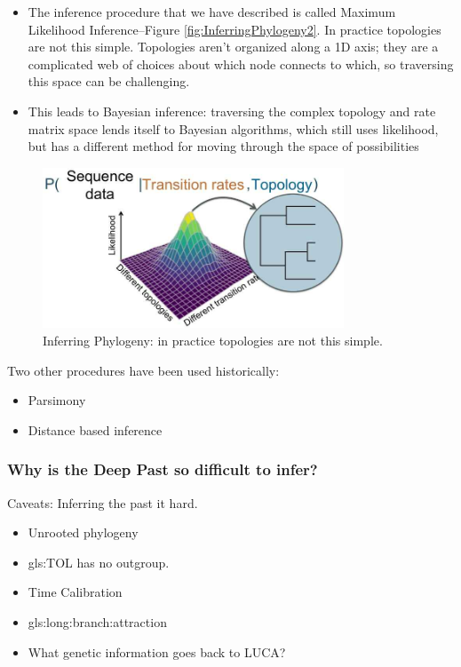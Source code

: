 \documentclass[]{article}
\begin{document}
\begin{itemize}
	\item The inference procedure that we have described is called Maximum Likelihood Inference\cite{huelsenbeck1997phylogeny}--Figure \ref{fig:InferringPhylogeny2}. In practice topologies are not this simple.
	Topologies aren't organized along a 1D axis; they are a complicated web of choices about which node connects to which, so traversing this space can be challenging.
	\item This leads to Bayesian inference: traversing the complex topology and
	rate matrix space lends itself to Bayesian algorithms, which still uses likelihood, but has a different method for moving through the space of possibilities\cite{huelsenbeck2001mrbayes,huelsenbeck2001introduction}
\end{itemize}

\begin{figure}[H]
	\caption[Inferring Phylogeny]{Inferring Phylogeny: in practice topologies are not this simple.}\label{fig:InferingPhylogeny}
	\includegraphics[width=0.8\textwidth]{InferingPhylogeny}
\end{figure}
Two other procedures have been used historically:
\begin{itemize}
	\item Parsimony
	\item Distance based inference
\end{itemize}

\subsubsection{Why is the Deep Past so difficult to infer?}
Caveats: Inferring the past it hard.
\begin{itemize}
	\item Unrooted phylogeny
	\item \gls{gls:TOL} has no outgroup.
	\item Time Calibration
	\item \Gls{gls:long:branch:attraction}
	\item What genetic information goes back to LUCA?
\end{itemize}
\end{document}
